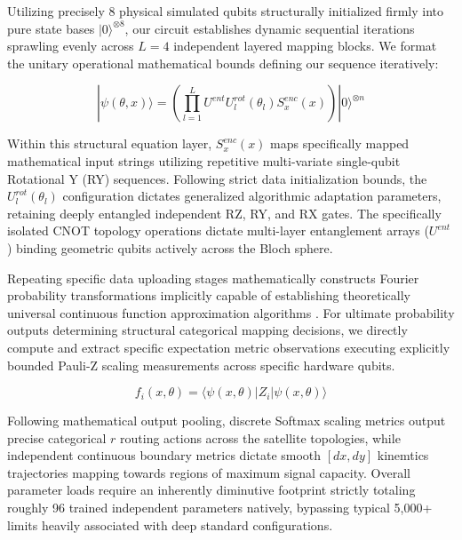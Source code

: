 \documentclass[conference]{IEEEtran}
\begin{document}
Utilizing precisely 8 physical simulated qubits structurally initialized firmly into pure state bases $|0\rangle^{\otimes 8}$, our circuit establishes dynamic sequential iterations sprawling evenly across $L = 4$ independent layered mapping blocks. We format the unitary operational mathematical bounds defining our sequence iteratively:

\begin{equation} \label{eq:vqc}
|\psi(\theta, x)\rangle = \left( \prod_{l=1}^{L} U^{ent} U_l^{rot}(\theta_l) S_{x}^{enc}(x) \right) |0\rangle^{\otimes n}
\end{equation}

Within this structural equation layer, $S_{x}^{enc}(x)$ maps specifically mapped mathematical input strings utilizing repetitive multi-variate single-qubit Rotational Y (RY) sequences. Following strict data initialization bounds, the $U_l^{rot}(\theta_l)$ configuration dictates generalized algorithmic adaptation parameters, retaining deeply entangled independent RZ, RY, and RX gates. The specifically isolated CNOT topology operations dictate multi-layer entanglement arrays ($U^{ent}$) binding geometric qubits actively across the Bloch sphere.

Repeating specific data uploading stages mathematically constructs Fourier probability transformations implicitly capable of establishing theoretically universal continuous function approximation algorithms \cite{perez2020}. For ultimate probability outputs determining structural categorical mapping decisions, we directly compute and extract specific expectation metric observations executing explicitly bounded Pauli-Z scaling measurements across specific hardware qubits. 

\begin{equation} \label{eq:expectation}
f_i(x, \theta) = \langle \psi(x, \theta) | Z_i | \psi(x, \theta) \rangle
\end{equation}

Following mathematical output pooling, discrete Softmax scaling metrics output precise categorical $r$ routing actions across the satellite topologies, while independent continuous boundary metrics dictate smooth $[dx, dy]$ kinemtics trajectories mapping towards regions of maximum signal capacity. Overall parameter loads require an inherently diminutive footprint strictly totaling roughly 96 trained independent parameters natively, bypassing typical 5,000+ limits heavily associated with deep standard configurations.
\end{document}
